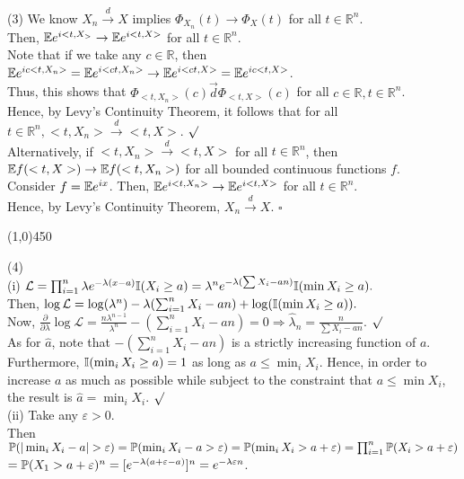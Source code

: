 \documentclass[12pt]{article}
\begin{document}
\noindent
(3) We know $X_n \overset{d}\to X$ implies $\Phi_{X_n}(t) \to \Phi_{X}(t)$ for all $t\in\mathbb{R}^n$.\\
Then, $\mathbb{E} e^{i<t,X_>} \to \mathbb{E} e^{i<t,X>}$ for all $t\in\mathbb{R}^n$.\\
Note that if we take any $c\in\mathbb{R}$, then $\mathbb{E} e^{ic<t,X_n>} = \mathbb{E} e^{i<ct,X_n>} \to \mathbb{E} e^{i<ct,X>} =\mathbb{E} e^{ic<t,X>}$.\\
Thus, this shows that $\Phi_{<t,X_n>}(c) \overset\to{d} \Phi_{<t,X>}(c)$ for all $c\in\mathbb{R},t\in\mathbb{R}^n$.\\
Hence, by Levy's Continuity Theorem, it follows that for all $t \in \mathbb{R}^n, <t,X_n>\overset{d}\to<t,X>.$ $\surd$\\

\noindent
Alternatively, if $<t,X_n>\overset{d}\to<t,X>$ for all $t\in\mathbb{R}^n$, then $\mathbb{E} f(<t,X>) \to \mathbb{E} f(<t,X_n>)$ for all bounded continuous functions $f$.\\
Consider $f = \mathbb{E} e^{ix}$.
Then, $\mathbb{E} e^{i<t,X_n>} \to \mathbb{E} e^{i<t,X>}$ for all $t\in\mathbb{R}^n$.\\
Hence, by Levy's Continuity Theorem, $X_n \overset{d}\to X$. $\square$

\begin{center}
\line(1,0){450}
\end{center}

\noindent
(4)\\
(i) $\mathcal{L} = \prod_{i=1}^n \lambda e^{-\lambda(x-a)}\mathbb{I}(X_i \geq a)
= \lambda^n e^{-\lambda(\sum X_i -an)}\mathbb{I}(\min X_i \geq a).$\\
Then, $\log \mathcal{L} = \log(\lambda^n) - \lambda(\sum_{i=1}^n X_i -an)+\log(\mathbb{I}(\min X_i \geq a)).$\\

\noindent
Now, $\frac{\partial}{\partial\lambda} \log\mathcal{L} =  \frac{n\lambda^{n-1}}{\lambda^n}-(\sum_{i=1}^nX_i -an) = 0 \Rightarrow \hat\lambda_n = \frac{n}{\sum X_i - an}$. $\surd$\\

\noindent
As for $\hat a$, note that $-(\sum_{i=1}^n X_i -an)$ is a strictly increasing function of $a$. Furthermore, $\mathbb{I}(\min_i X_i \geq a)=1$ as long as $a \leq \min_i X_i$. Hence, in order to increase $a$ as much as possible while subject to the constraint that $a \leq \min X_i$, the result is $\hat a = \min_i X_i$. $\surd$\\

\pagebreak
\noindent
(ii)  Take any $\varepsilon > 0$.\\
Then $\mathbb{P}(|\min_i X_i - a| > \varepsilon) = \mathbb{P}(\min_i X_i -a > \varepsilon) = \mathbb{P}(\min_i X_i > a+\varepsilon) = \prod_{i=1}^n \mathbb{P}(X_i > a+\varepsilon)$\\
\indent $ = \mathbb{P}(X_1 > a+\varepsilon)^n = [e^{-\lambda(a+\varepsilon-a)}]^n = e^{-\lambda\varepsilon n}$.\\
\end{document}
